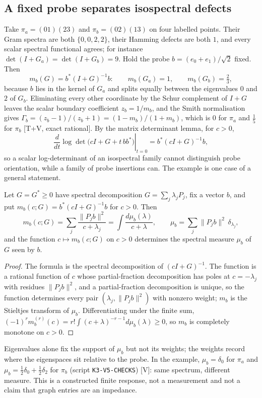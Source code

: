 \documentclass[11pt]{article}
\theoremstyle{remark}\newtheorem{remark}[theorem]{Remark}
\begin{document}
\subsection{A fixed probe separates isospectral defects}
Take $\pi_a=(01)(23)$ and $\pi_b=(02)(13)$ on four labelled points. Their Gram spectra are both $\{0,0,2,2\}$, their Hamming defects are both $1$, and every scalar spectral functional agrees; for instance $\det(I+G_a)=\det(I+G_b)=9$. Hold the probe $b=(e_0+e_1)/\sqrt2$ fixed. Then
\[
m_b(G)=b^*(I+G)^{-1}b:\qquad m_b(G_a)=1,\qquad m_b(G_b)=\tfrac23,
\]
because $b$ lies in the kernel of $G_a$ and splits equally between the eigenvalues $0$ and $2$ of $G_b$. Eliminating every other coordinate by the Schur complement of $I+G$ leaves the scalar boundary coefficient $z_b=1/m_b$, and the Smith normalisation gives $\Gamma_b=(z_b-1)/(z_b+1)=(1-m_b)/(1+m_b)$, which is $0$ for $\pi_a$ and $\tfrac15$ for $\pi_b$ [T+V, exact rational]. By the matrix determinant lemma, for $c>0$,
\[
\left.\frac{d}{dt}\log\det\big(cI+G+t\,bb^*\big)\right|_{t=0}=b^*(cI+G)^{-1}b,
\]
so a scalar log-determinant of an isospectral family cannot distinguish probe orientation, while a family of probe insertions can. The example is one case of a general statement.
\begin{proposition}\label{prop:probe}
Let $G=G^*\ge0$ have spectral decomposition $G=\sum_j\lambda_jP_j$, fix a vector $b$, and put $m_b(c;G)=b^*(cI+G)^{-1}b$ for $c>0$. Then
\[
m_b(c;G)=\sum_j\frac{\|P_jb\|^2}{c+\lambda_j}=\int\frac{d\mu_b(\lambda)}{c+\lambda},\qquad \mu_b=\sum_j\|P_jb\|^2\,\delta_{\lambda_j},
\]
and the function $c\mapsto m_b(c;G)$ on $c>0$ determines the spectral measure $\mu_b$ of $G$ seen by $b$.
\end{proposition}
\begin{proof}
The formula is the spectral decomposition of $(cI+G)^{-1}$. The function is a rational function of $c$ whose partial-fraction decomposition has poles at $c=-\lambda_j$ with residues $\|P_jb\|^2$, and a partial-fraction decomposition is unique, so the function determines every pair $(\lambda_j,\|P_jb\|^2)$ with nonzero weight; $m_b$ is the Stieltjes transform of $\mu_b$. Differentiating under the finite sum, $(-1)^rm_b^{(r)}(c)=r!\int(c+\lambda)^{-r-1}d\mu_b(\lambda)\ge0$, so $m_b$ is completely monotone on $c>0$.
\end{proof}
Eigenvalues alone fix the support of $\mu_b$ but not its weights; the weights record where the eigenspaces sit relative to the probe. In the example, $\mu_b=\delta_0$ for $\pi_a$ and $\mu_b=\tfrac12\delta_0+\tfrac12\delta_2$ for $\pi_b$ (script \texttt{K3-V5-CHECKS}) [V]: same spectrum, different measure. This is a constructed finite response, not a measurement and not a claim that graph entries are an impedance.
\end{document}
